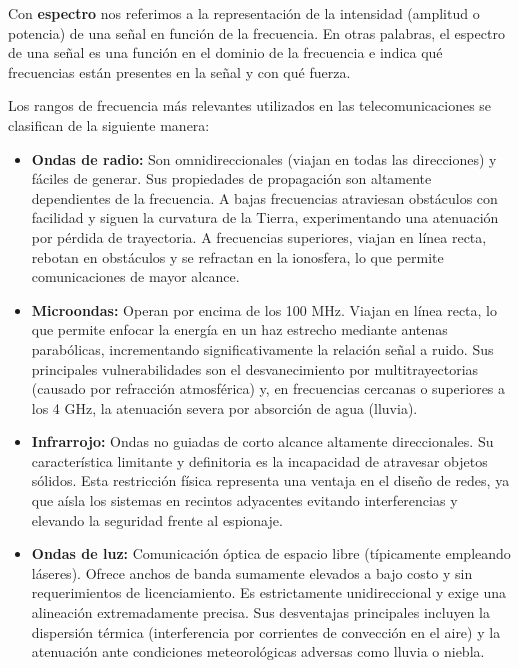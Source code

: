 \begin{obs}
  Con \textbf{espectro} nos referimos a la representación de la intensidad (amplitud o potencia) de una señal en función de la frecuencia. En otras palabras, el espectro de una señal es una función en el dominio de la frecuencia e indica qué frecuencias están presentes en la señal y con qué fuerza.
\end{obs}

Los rangos de frecuencia más relevantes utilizados en las telecomunicaciones se clasifican de la siguiente manera:

\begin{itemize}
    \item \textbf{Ondas de radio:} Son omnidireccionales (viajan en todas las direcciones) y fáciles de generar. Sus propiedades de propagación son altamente dependientes de la frecuencia. A bajas frecuencias atraviesan obstáculos con facilidad y siguen la curvatura de la Tierra, experimentando una atenuación por pérdida de trayectoria. A frecuencias superiores, viajan en línea recta, rebotan en obstáculos y se refractan en la ionosfera, lo que permite comunicaciones de mayor alcance.
    
    \item \textbf{Microondas:} Operan por encima de los 100 MHz. Viajan en línea recta, lo que permite enfocar la energía en un haz estrecho mediante antenas parabólicas, incrementando significativamente la relación señal a ruido. Sus principales vulnerabilidades son el desvanecimiento por multitrayectorias (causado por refracción atmosférica) y, en frecuencias cercanas o superiores a los 4 GHz, la atenuación severa por absorción de agua (lluvia).
    
    \item \textbf{Infrarrojo:} Ondas no guiadas de corto alcance altamente direccionales. Su característica limitante y definitoria es la incapacidad de atravesar objetos sólidos. Esta restricción física representa una ventaja en el diseño de redes, ya que aísla los sistemas en recintos adyacentes evitando interferencias y elevando la seguridad frente al espionaje.
    
    \item \textbf{Ondas de luz:} Comunicación óptica de espacio libre (típicamente empleando láseres). Ofrece anchos de banda sumamente elevados a bajo costo y sin requerimientos de licenciamiento. Es estrictamente unidireccional y exige una alineación extremadamente precisa. Sus desventajas principales incluyen la dispersión térmica (interferencia por corrientes de convección en el aire) y la atenuación ante condiciones meteorológicas adversas como lluvia o niebla.
\end{itemize}

